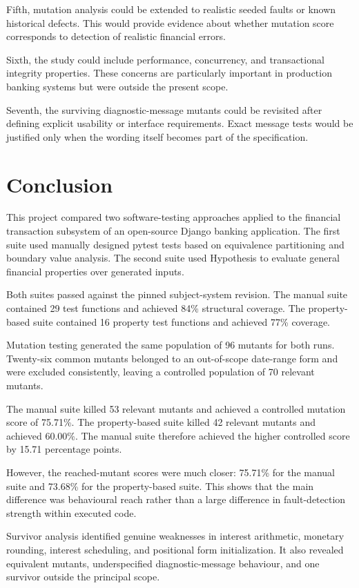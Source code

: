 \documentclass[12pt]{article}
\begin{document}
Fifth, mutation analysis could be extended to realistic seeded faults or known
historical defects. This would provide evidence about whether mutation score
corresponds to detection of realistic financial errors.

Sixth, the study could include performance, concurrency, and transactional
integrity properties. These concerns are particularly important in production
banking systems but were outside the present scope.

Seventh, the surviving diagnostic-message mutants could be revisited after
defining explicit usability or interface requirements. Exact message tests
would be justified only when the wording itself becomes part of the
specification.

\section{Conclusion}

This project compared two software-testing approaches applied to the financial
transaction subsystem of an open-source Django banking application. The first
suite used manually designed pytest tests based on equivalence partitioning and
boundary value analysis. The second suite used Hypothesis to evaluate general
financial properties over generated inputs.

Both suites passed against the pinned subject-system revision. The manual suite
contained 29 test functions and achieved 84\% structural coverage. The
property-based suite contained 16 property test functions and achieved 77\%
coverage.

Mutation testing generated the same population of 96 mutants for both runs.
Twenty-six common mutants belonged to an out-of-scope date-range form and were
excluded consistently, leaving a controlled population of 70 relevant mutants.

The manual suite killed 53 relevant mutants and achieved a controlled mutation
score of 75.71\%. The property-based suite killed 42 relevant mutants and
achieved 60.00\%. The manual suite therefore achieved the higher controlled
score by 15.71 percentage points.

However, the reached-mutant scores were much closer: 75.71\% for the manual
suite and 73.68\% for the property-based suite. This shows that the main
difference was behavioural reach rather than a large difference in
fault-detection strength within executed code.

Survivor analysis identified genuine weaknesses in interest arithmetic,
monetary rounding, interest scheduling, and positional form initialization.
It also revealed equivalent mutants, underspecified diagnostic-message
behaviour, and one survivor outside the principal scope.
\end{document}
